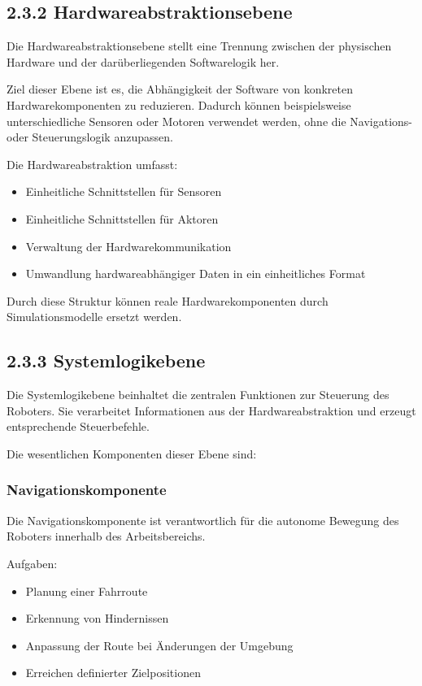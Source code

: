 \documentclass[
]{article}
\providecommand{\tightlist}{%
  \setlength{\itemsep}{0pt}\setlength{\parskip}{0pt}}
\begin{document}
\subsection{2.3.2
Hardwareabstraktionsebene}\label{hardwareabstraktionsebene}

Die Hardwareabstraktionsebene stellt eine Trennung zwischen der
physischen Hardware und der darüberliegenden Softwarelogik her.

Ziel dieser Ebene ist es, die Abhängigkeit der Software von konkreten
Hardwarekomponenten zu reduzieren. Dadurch können beispielsweise
unterschiedliche Sensoren oder Motoren verwendet werden, ohne die
Navigations- oder Steuerungslogik anzupassen.

Die Hardwareabstraktion umfasst:

\begin{itemize}
\tightlist
\item
  Einheitliche Schnittstellen für Sensoren
\item
  Einheitliche Schnittstellen für Aktoren
\item
  Verwaltung der Hardwarekommunikation
\item
  Umwandlung hardwareabhängiger Daten in ein einheitliches Format
\end{itemize}

Durch diese Struktur können reale Hardwarekomponenten durch
Simulationsmodelle ersetzt werden.

\subsection{2.3.3 Systemlogikebene}\label{systemlogikebene}

Die Systemlogikebene beinhaltet die zentralen Funktionen zur Steuerung
des Roboters. Sie verarbeitet Informationen aus der Hardwareabstraktion
und erzeugt entsprechende Steuerbefehle.

Die wesentlichen Komponenten dieser Ebene sind:

\subsubsection{Navigationskomponente}\label{navigationskomponente}

Die Navigationskomponente ist verantwortlich für die autonome Bewegung
des Roboters innerhalb des Arbeitsbereichs.

Aufgaben:

\begin{itemize}
\tightlist
\item
  Planung einer Fahrroute
\item
  Erkennung von Hindernissen
\item
  Anpassung der Route bei Änderungen der Umgebung
\item
  Erreichen definierter Zielpositionen
\end{itemize}
\end{document}
